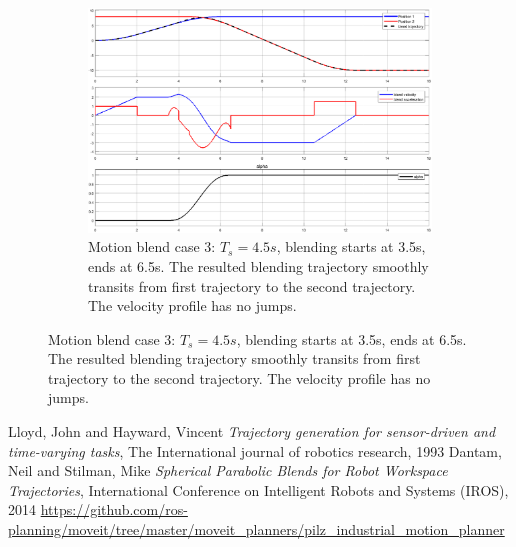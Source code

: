 \documentclass{article}
\begin{document}
\begin{figure}[ht]
	\begin{subfigure}[ht]{0.8\textwidth}%
		\centering
		\includegraphics[width=0.8\columnwidth]{figure/blend_case_3.eps}%
		\caption{Motion blend case 3: $T_s = 4.5s$, blending starts at 3.5s, ends at 6.5s. The resulted blending trajectory smoothly transits from first trajectory to the second trajectory. The velocity profile has no jumps.}%
		\label{blend_case_3}%
	\end{subfigure}

\end{figure}


\begin{thebibliography}{9}
Lloyd, John and Hayward, Vincent \textit{Trajectory generation for sensor-driven and time-varying tasks}, The International journal of robotics research, 1993
Dantam, Neil and Stilman, Mike \textit{Spherical Parabolic Blends for Robot Workspace Trajectories}, International Conference on Intelligent Robots and Systems (IROS), 2014
\url{https://github.com/ros-planning/moveit/tree/master/moveit_planners/pilz_industrial_motion_planner}
\end{thebibliography}
\end{document}
